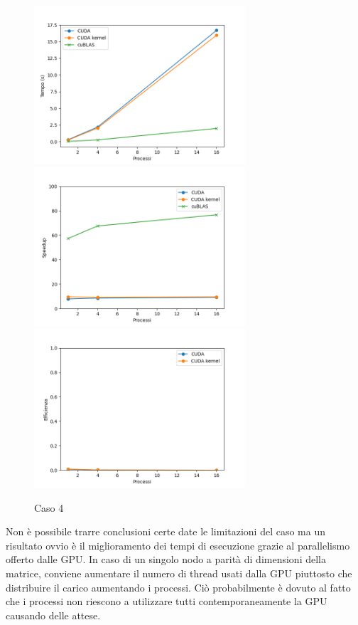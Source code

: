 \begin{figure}[h]
    \centering
    \includegraphics[width=0.7\textwidth]{./imgs/graphs/caso_d.png}
    \includegraphics[width=0.7\textwidth]{./imgs/graphs/caso_d_speedup.png}
    \includegraphics[width=0.7\textwidth]{./imgs/graphs/caso_d_efficiency.png}
    \caption{Caso 4}
\end{figure}

Non è possibile trarre conclusioni certe date le limitazioni del caso ma un risultato ovvio è il miglioramento dei tempi di esecuzione grazie al parallelismo offerto dalle GPU.
In caso di un singolo nodo a parità di dimensioni della matrice, conviene aumentare il numero di thread usati dalla GPU piuttosto che distribuire il carico aumentando i processi. Ciò probabilmente è dovuto al fatto che i processi non riescono a utilizzare tutti contemporaneamente la GPU causando delle attese.

